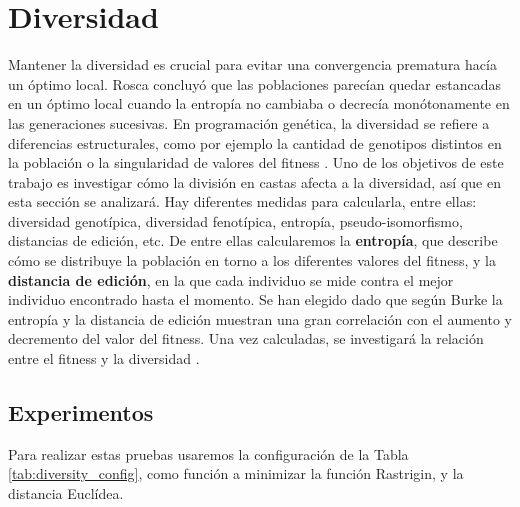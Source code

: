 \section{Diversidad}

Mantener la diversidad es crucial para evitar una convergencia prematura hacía un óptimo local. Rosca \cite{Rosca} concluyó que las poblaciones parecían quedar estancadas
en un óptimo local cuando la entropía no cambiaba o decrecía monótonamente en las generaciones sucesivas. En programación genética, la diversidad se refiere a diferencias estructurales, 
como por ejemplo la cantidad de genotipos distintos en la población o la singularidad de valores del fitness \cite{genetic}. Uno de los objetivos de este trabajo es investigar cómo la 
división en castas afecta a la diversidad, así que en esta sección se analizará.  Hay diferentes medidas para calcularla, entre ellas: diversidad genotípica, 
diversidad fenotípica, entropía, pseudo-isomorfismo, distancias de edición, etc. De entre ellas calcularemos la \textbf{entropía}, que describe cómo se distribuye la
población en torno a los diferentes valores del fitness, y la \textbf{distancia de edición}, en la que cada individuo se mide contra el mejor individuo encontrado hasta el 
momento. Se han elegido dado que según Burke \cite{diversity} la entropía y la distancia de edición muestran una gran correlación con el aumento y decremento del valor 
del fitness. Una vez calculadas, se investigará la relación entre el fitness y la diversidad \cite{diversity}. 

\subsection{Experimentos}

Para realizar estas pruebas usaremos la configuración de la Tabla \ref{tab:diversity_config}, como función a minimizar la función Rastrigin\cite{BBOB}, y la distancia Euclídea.

